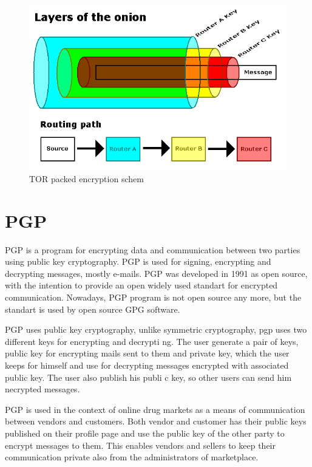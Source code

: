 \documentclass[
  digital, %
  table,   %
  lof,     %
  lot,     %
  oneside
]{fithesis3}
\begin{document}
  \begin{figure}[!htb]
    \centering
    \includegraphics[width=1\textwidth]{tor-packet-prejate}
    \caption{TOR packed encryption schem}
    \label{TOR packed encryption schema}
\end{figure}
 
\section{PGP}

PGP is a program for encrypting data and communication between two parties using public key cryptography.
PGP is used for signing, encrypting and decrypting messages, mostly e-mails.
PGP was developed in 1991 as open source, with the intention 
to provide an open widely used standart for encrypted communication.
Nowadays, PGP program is not open source any more, but the standart is used by open source GPG software.

PGP uses public key cryptography, unlike symmetric cryptography, pgp uses two different keys for encrypting and decrypti
ng.
The user generate a pair of keys, public key for encrypting mails sent to them and private key, which the user
 keeps for himself and use for decrypting messages encrypted with associated public key. The user also publish his publi
c
 key, so other users can send him necrypted messages.

PGP is used in the context of online drug markets as a means of communication between vendors and customers.
Both vendor and customer has their public keys published on their profile page and use the public key of the other
party to encrypt messages to them. This enables vendors and sellers to keep their communication private also 
from the administrators of marketplace.
\end{document}
